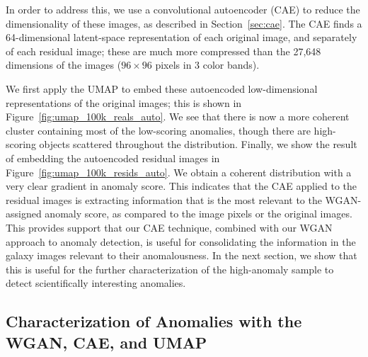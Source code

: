 In order to address this, we use a convolutional autoencoder (CAE) to reduce the dimensionality of these images, as described in Section~\ref{sec:cae}.
The CAE finds a 64-dimensional latent-space representation of each original image, and separately of each residual image; these are much more compressed than the 27,648 dimensions of the images ($96 \times 96$ pixels in 3 color bands).

We first apply the UMAP to embed these autoencoded low-dimensional representations of the original images; this is shown in Figure~\ref{fig:umap_100k_reals_auto}.
We see that there is now a more coherent cluster containing most of the low-scoring anomalies, though there are high-scoring objects scattered throughout the distribution.
Finally, we show the result of embedding the autoencoded residual images in Figure~\ref{fig:umap_100k_resids_auto}. 
We obtain a coherent distribution with a very clear gradient in anomaly score.
This indicates that the CAE applied to the residual images is extracting information that is the most relevant to the WGAN-assigned anomaly score, as compared to the image pixels or the original images.
This provides support that our CAE technique, combined with our WGAN approach to anomaly detection, is useful for consolidating the information in the galaxy images relevant to their anomalousness.
In the next section, we show that this is useful for the further characterization of the high-anomaly sample to detect scientifically interesting anomalies.


\subsection{Characterization of Anomalies with the WGAN, CAE, and UMAP}

